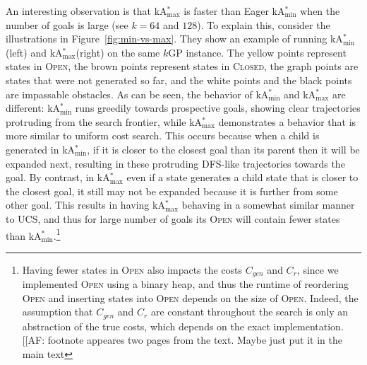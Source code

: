 \documentclass[twoside,11pt]{article}
\newcommand{\kgs}{$k$GP\xspace}
\newcommand{\kastar}{kA$^*$\xspace}
\newcommand{\kastarvar}[1]{\textup{kA}$^*_{#1}$\xspace}
\newcommand{\kastarmin}{\kastarvar{\min}}
\newcommand{\kastarmax}{\kastarvar{\max}}
\newcommand{\open}{\textsc{Open}\xspace}
\newcommand{\closed}{\textsc{Closed}\xspace}
\newcommand{\roni}[1]{\textbf{[RS:#1]}}
\begin{document}
An interesting observation is that \kastarmax is faster than Eager \kastarmin when the number of goals is large (see $k=64$ and $128$).
To explain this, consider the illustrations in Figure~\ref{fig:min-vs-max}.
They show an example of running \kastarmin (left) and \kastarmax (right) on the same \kgs instance.
The yellow points represent states in \open, the brown points represent states in \closed, the graph points are states that were not generated so far, and the white points and the black points are impassable obstacles.
As can be seen, the behavior of \kastarmin and \kastarmax are different: \kastarmin runs greedily towards prospective goals, showing clear trajectories protruding from the search frontier, while \kastarmax demonstrates a behavior that is more similar to uniform cost search.
This occurs because when a child is generated in \kastarmin, if it is closer to the closest goal than its parent then it will be expanded next, resulting in these protruding DFS-like trajectories towards the goal.
By contrast, in \kastarmax even if a state generates a child state that is closer to the closest goal, it still may not be expanded because it is further from some other goal.
This results in having \kastarmax behaving in a somewhat similar manner to UCS, and thus for large number of goals its \open will contain fewer states than \kastarmin.\footnote{Having fewer states in \open also impacts the costs $C_{gen}$ and $C_{r}$, since we implemented \open using a binary heap, and thus the runtime of reordering \open and inserting states into \open depends on the size of \open.
Indeed, the assumption that $C_{gen}$ and $C_r$ are constant throughout the search is only an abstraction of the true costs, which depends on the exact implementation. [[AF: footnote appeares two pages from the text. Maybe just put it in the main text}




\end{document}
